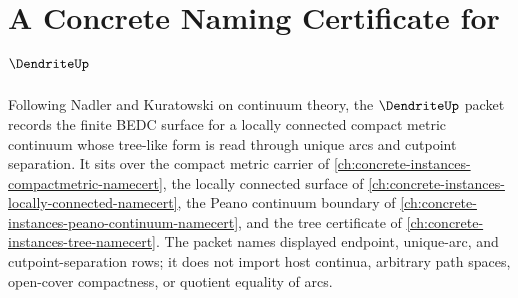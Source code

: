 \chapter{A Concrete Naming Certificate for $\DendriteUp$}
\label{ch:concrete-instances-dendrite-namecert}

Following Nadler and Kuratowski on continuum theory, the $\DendriteUp$ packet records the finite BEDC surface for a locally connected compact metric continuum whose tree-like form is read through unique arcs and cutpoint separation. It sits over the compact metric carrier of \autoref{ch:concrete-instances-compactmetric-namecert}, the locally connected surface of \autoref{ch:concrete-instances-locally-connected-namecert}, the Peano continuum boundary of \autoref{ch:concrete-instances-peano-continuum-namecert}, and the tree certificate of \autoref{ch:concrete-instances-tree-namecert}. The packet names displayed endpoint, unique-arc, and cutpoint-separation rows; it does not import host continua, arbitrary path spaces, open-cover compactness, or quotient equality of arcs.

